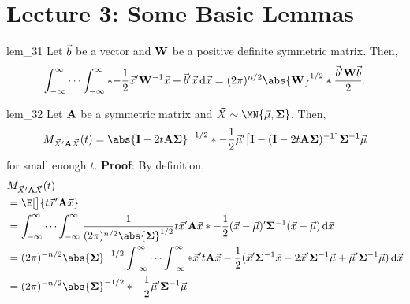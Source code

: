 \section{Lecture 3: Some Basic Lemmas}
\begin{Lemma}{}{lem_31}
    Let $ \vec{b} $ be a vector and $ \mathbf{W} $ be a positive definite
    symmetric matrix. Then,
    \[ \int_{-\infty}^{\infty}
        \cdots\int_{-\infty}^{\infty}
        \exp*{-\frac{1}{2}\Vector{x}'\Matrix{W}^{-1}\Vector{x}+\Vector{b}'\Vector{x}}\odif{\Vector{x}}
        =(2\pi)^{n/2}\abs{\Matrix{W}}^{1/2}\exp*{\frac{\Vector{b}'\Matrix{W}\Vector{b}}{2}}. \]
\end{Lemma}
\begin{Lemma}{}{lem_32}
    Let $ \mathbf{A} $ be a symmetric matrix and
    $ \Vector{X} \sim \MN{\Vector{\mu},\Matrix{\Sigma}} $. Then,
    \[ M_{\Vector{X}'\Matrix{A}\Vector{X}}(t)
        =\abs{\Matrix{I}-2t \Matrix{A}\Matrix{\Sigma}}^{-1/2}
        \exp*{-\frac{1}{2}\Vector{\mu}'\bigl[\Matrix{I}-(\Matrix{I}-2t \Matrix{A}\Matrix{\Sigma})^{-1}\bigr]\Matrix{\Sigma}^{-1}\Vector{\mu}} \]
    for small enough $ t $.
    \tcblower{}
    \textbf{Proof}: By definition,
    \begin{align*}
         & M_{\Vector{X}'\Matrix{A}\Vector{X}}(t)                                                                         \\
         & =\E[\big]{\exp{t \Vector{x}' \Matrix{A}\Vector{x}}}                                                            \\
         & =\int_{-\infty}^{\infty}\cdots \int_{-\infty}^{\infty}
        \frac{1}{(2\pi)^{n/2}\abs{\Matrix{\Sigma}}^{1/2}}
        \exp{t \Vector{x}' \Matrix{A}\Vector{x}}
        \exp*{-\frac{1}{2}(\Vector{x}-\Vector{\mu})' \Matrix{\Sigma}^{-1}(\Vector{x}-\Vector{\mu})}
        \odif{\Vector{x}}                                                                                                 \\
         & =(2\pi)^{-n/2}\abs{\Matrix{\Sigma}}^{-1/2}
        \int_{-\infty}^{\infty}\cdots \int_{-\infty}^{\infty}
        \exp*{\Vector{x}' t \Matrix{A}\Vector{x}-\frac{1}{2}
            (\Vector{x}'\Matrix{\Sigma}^{-1}\Vector{x}-2 \Vector{x}' \Matrix{\Sigma}^{-1}\Vector{\mu}+\Vector{\mu}' \Matrix{\Sigma}^{-1}\Vector{\mu})}
        \odif{\Vector{x}}                                                                                                 \\
         & =(2\pi)^{-n/2}\abs{\Matrix{\Sigma}}^{-1/2}\exp*{-\frac{1}{2}\Vector{\mu}' \Matrix{\Sigma}^{-1}\Vector{\mu}}

\end{align*}
\end{Lemma}

